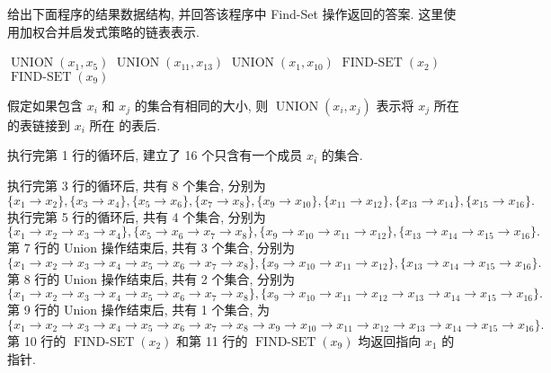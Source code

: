 \documentclass[boxes]{homework}
\begin{document}
\begin{problem}
给出下面程序的结果数据结构, 并回答该程序中 {\sc Find-Set} 操作返回的答案. 这里使
用加权合并启发式策略的链表表示.

\begin{algorithm}[H]
    $\operatorname{UNION}(x_{1}, x_{5})$\;
    $\operatorname{UNION}(x_{11}, x_{13})$\;
    $\operatorname{UNION}(x_{1}, x_{10})$\;
    $\operatorname{FIND-SET}(x_{2})$\;
    $\operatorname{FIND-SET}(x_{9})$\;
\end{algorithm}
假定如果包含 $x_{i}$ 和 $x_{j}$ 的集合有相同的大小, 则
$\operatorname{UNION}(x_{i}, x_{j})$ 表示将 $x_{j}$ 所在的表链接到 $x_{i}$ 所在
的表后.
\end{problem}
\begin{solution}
    执行完第 1 行的循环后, 建立了 16 个只含有一个成员 $x_{i}$ 的集合.

    执行完第 3 行的循环后, 共有 8 个集合, 分别为
    \[
        \{x_{1} \to x_{2}\},
        \{x_{3} \to x_{4}\},
        \{x_{5} \to x_{6}\},
        \{x_{7} \to x_{8}\},
        \{x_{9} \to x_{10}\},
        \{x_{11} \to x_{12}\},
        \{x_{13} \to x_{14}\},
        \{x_{15} \to x_{16}\}.
    \]
    执行完第 5 行的循环后, 共有 4 个集合, 分别为
    \[
        \{x_{1} \to x_{2} \to x_{3} \to x_{4}\},
        \{x_{5} \to x_{6} \to x_{7} \to x_{8}\},
        \{x_{9} \to x_{10} \to x_{11} \to x_{12}\},
        \{x_{13} \to x_{14} \to x_{15} \to x_{16}\}.
    \]
    第 7 行的 {\sc Union} 操作结束后, 共有 3 个集合, 分别为
    \[
        \{x_{1} \to x_{2} \to x_{3} \to x_{4} \to x_{5} \to x_{6} \to x_{7}
        \to x_{8}\},
        \{x_{9} \to x_{10} \to x_{11} \to x_{12}\},
        \{x_{13} \to x_{14} \to x_{15} \to x_{16}\}.
    \]
    第 8 行的 {\sc Union} 操作结束后, 共有 2 个集合, 分别为
    \[
        \{x_{1} \to x_{2} \to x_{3} \to x_{4} \to x_{5} \to x_{6} \to x_{7}
        \to x_{8}\},
        \{x_{9} \to x_{10} \to x_{11} \to x_{12} \to x_{13} \to x_{14} \to
        x_{15} \to x_{16}\}.
    \]
    第 9 行的 {\sc Union} 操作结束后, 共有 1 个集合, 为
    \[
        \{x_{1} \to x_{2} \to x_{3} \to x_{4} \to x_{5} \to x_{6} \to x_{7}
        \to x_{8} \to x_{9} \to x_{10} \to x_{11} \to x_{12} \to x_{13}
        \to x_{14} \to x_{15} \to x_{16}\}.
    \]
    第 10 行的 $\operatorname{FIND-SET}(x_{2})$ 和第 11 行的
    $\operatorname{FIND-SET}(x_{9})$ 均返回指向 $x_{1}$ 的指针.
\end{solution}
\end{document}
